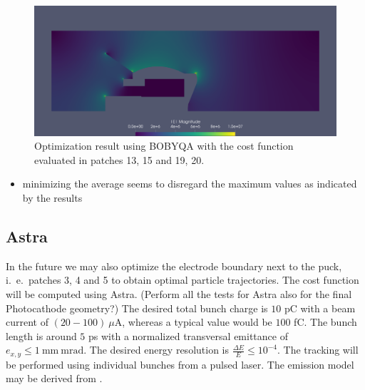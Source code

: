\begin{center}
\begin{figure}[H]
   \includegraphics[width=\textwidth]{figures/200kV/bobyqa_run7_newcostfunction}
   \caption{Optimization result using BOBYQA with the cost function evaluated in patches 13, 15 and 19, 20.}
\end{figure}
\end{center}

\begin{itemize}
   \item minimizing the average seems to disregard the maximum values as indicated by the results
\end{itemize}

\subsection{Astra}
In the future we may also optimize the electrode boundary next to the puck, i.~e.~patches 3, 4 and 5 to obtain optimal particle trajectories. The cost function will be computed using Astra. (Perform all the tests for Astra also for the final Photocathode geometry?)
The desired total bunch charge is $10$ pC with a beam current of $(20-100)\ \mu\mathrm{A}$, whereas a typical value would be $100$ fC. The bunch length is around $5$ ps with a normalized transversal emittance of $e_{x,y} \leq 1\ \mathrm{mm\ mrad}$. The desired energy resolution is $\frac{\Delta E}{E} \leq 10^{-4}$.
The tracking will be performed using individual bunches from a pulsed laser. The emission model may be derived from \cite{wagner}.
